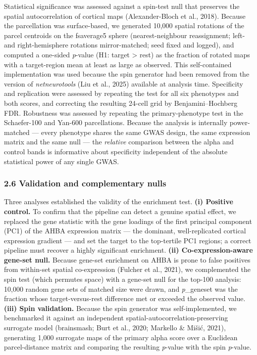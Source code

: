 \documentclass[
  11pt,
  letterpaper,
]{article}
\begin{document}
Statistical significance was assessed against a spin-test null that
preserves the spatial autocorrelation of cortical maps (Alexander-Bloch
et al., 2018). Because the parcellation was surface-based, we generated
10,000 spatial rotations of the parcel centroids on the fsaverage5
sphere (nearest-neighbour reassignment; left- and right-hemisphere
rotations mirror-matched; seed fixed and logged), and computed a
one-sided \emph{p}-value (H1: target \textgreater{} rest) as the
fraction of rotated maps with a target-region mean at least as large as
observed. This self-contained implementation was used because the spin
generator had been removed from the version of \emph{netneurotools} (Liu
et al., 2025) available at analysis time. Specificity and replication
were assessed by repeating the test for all six phenotypes and both
scores, and correcting the resulting 24-cell grid by Benjamini--Hochberg
FDR. Robustness was assessed by repeating the primary-phenotype test in
the Schaefer-100 and Yan-600 parcellations. Because the analysis is
internally power-matched --- every phenotype shares the same GWAS
design, the same expression matrix and the same null --- the
\emph{relative} comparison between the alpha and control bands is
informative about specificity independent of the absolute statistical
power of any single GWAS.

\subsubsection{2.6 Validation and complementary
nulls}\label{validation-and-complementary-nulls}

Three analyses established the validity of the enrichment test.
\textbf{(i) Positive control.} To confirm that the pipeline can detect a
genuine spatial effect, we replaced the gene statistic with the gene
loadings of the first principal component (PC1) of the AHBA expression
matrix --- the dominant, well-replicated cortical expression gradient
--- and set the target to the top-tertile PC1 regions; a correct
pipeline must recover a highly significant enrichment. \textbf{(ii)
Co-expression-aware gene-set null.} Because gene-set enrichment on AHBA
is prone to false positives from within-set spatial co-expression
(Fulcher et al., 2021), we complemented the spin test (which permutes
space) with a gene-set null for the top-100 analysis: 10,000 random gene
sets of matched size were drawn, and \emph{p}\_geneset was the fraction
whose target-versus-rest difference met or exceeded the observed value.
\textbf{(iii) Spin validation.} Because the spin generator was
self-implemented, we benchmarked it against an independent
spatial-autocorrelation-preserving surrogate model (brainsmash; Burt et
al., 2020; Markello \& Mišić, 2021), generating 1,000 surrogate maps of
the primary alpha score over a Euclidean parcel-distance matrix and
comparing the resulting \emph{p}-value with the spin \emph{p}-value.
\end{document}
